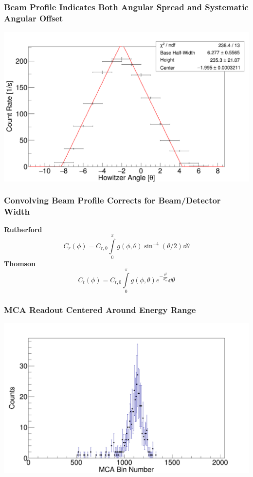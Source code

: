 \documentclass{beamer}
\begin{document}
    \begin{frame}
      \frametitle{Beam Profile Indicates Both Angular Spread and Systematic Angular Offset }
      \includegraphics[width=1\textwidth]{c1.png}
    \end{frame}


\begin{frame}
  \frametitle{Convolving Beam Profile Corrects for Beam/Detector Width}
  \textbf{Rutherford}
  \begin{equation*}
    C_r(\phi) = C_{r,0}\int\limits_0^\pi g(\phi, \theta) \sin^{-4}(\theta/2) \dd{\theta}
  \end{equation*}
  \textbf{Thomson}
  \begin{equation*}
    C_t(\phi) = C_{t,0} \int\limits_0^\pi g(\phi, \theta) e^{-\frac{\theta^2}{\theta_m^2}}  \dd{\theta}
  \end{equation*}
\end{frame}

\begin{frame}
  \frametitle{MCA Readout Centered Around Energy Range}
  \includegraphics[width=1\textwidth]{mca_readout}
\end{frame}
\end{document}
